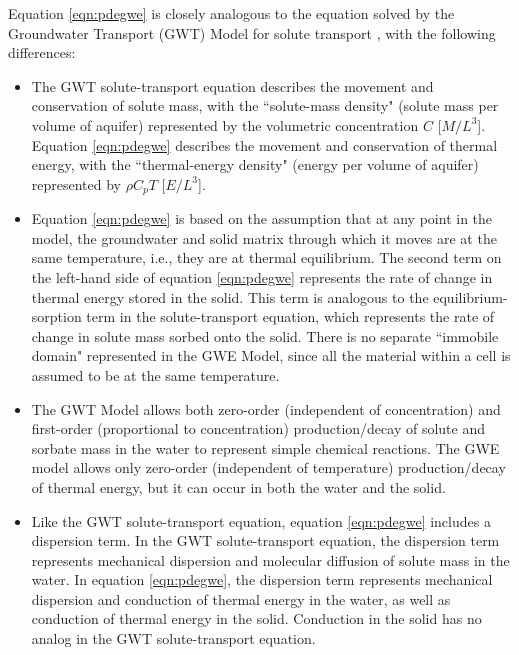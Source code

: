 Equation \ref{eqn:pdegwe} is closely analogous to the equation solved by the Groundwater Transport (GWT) Model for solute transport \citep{modflow6gwt}, with the following differences:

\begin{itemize}
\item The GWT solute-transport equation describes the movement and conservation of solute mass, with the ``solute-mass density" (solute mass per volume of aquifer) represented by the volumetric concentration $C$ [$M/L^3$]. Equation \ref{eqn:pdegwe} describes the movement and conservation of thermal energy, with the ``thermal-energy density" (energy per volume of aquifer) represented by $\rho C_{p} T$ [$E/L^3$].
\item Equation \ref{eqn:pdegwe} is based on the assumption that at any point in the model, the groundwater and solid matrix through which it moves are at the same temperature, i.e., they are at thermal equilibrium. The second term on the left-hand side of equation \ref{eqn:pdegwe} represents the rate of change in thermal energy stored in the solid. This term is analogous to the equilibrium-sorption term in the solute-transport equation, which represents the rate of change in solute mass sorbed onto the solid. There is no separate ``immobile domain" represented in the GWE Model, since all the material within a cell is assumed to be at the same temperature.
\item The GWT Model allows both zero-order (independent of concentration) and first-order (proportional to concentration) production/decay of solute and sorbate mass in the water to represent simple chemical reactions. The GWE model allows only zero-order (independent of temperature) production/decay of thermal energy, but it can occur in both the water and the solid.
\item Like the GWT solute-transport equation, equation \ref{eqn:pdegwe} includes a dispersion term. In the GWT solute-transport equation, the dispersion term represents mechanical dispersion and molecular diffusion of solute mass in the water. In equation \ref{eqn:pdegwe}, the dispersion term represents mechanical dispersion and conduction of thermal energy in the water, as well as conduction of thermal energy in the solid. Conduction in the solid has no analog in the GWT solute-transport equation.
\end{itemize}


